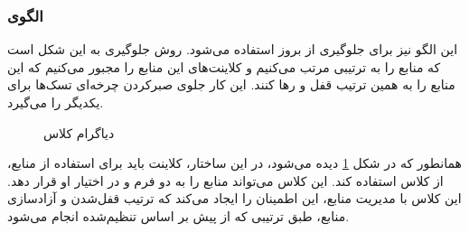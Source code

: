 \subsubsection{الگوی }
\label{scheduleOrderedSec}
\begin{RTL}
این الگو نیز برای جلوگیری از بروز  استفاده می‌شود.
روش جلوگیری به این شکل است که منابع را به ترتیبی مرتب می‌کنیم و
کلاینت‌های این منابع را مجبور می‌کنیم که این منابع را به همین ترتیب قفل و
رها کنند. این کار جلوی صبرکردن چرخه‌ای تسک‌ها برای یکدیگر را می‌گیرد.
\end{RTL}
\begin{figure}[h!]
\centering
{}
\caption{دیاگرام کلاس }
\label{scheduleOrderedClassDiag}
\end{figure}
\begin{RTL}
همانطور که در شکل \ref{scheduleOrderedClassDiag} دیده
می‌شود، در این ساختار، کلاینت باید برای استفاده از منابع، از کلاس
 استفاده کند. این کلاس می‌تواند منابع را به
دو فرم  و  در اختیار او قرار دهد.
این کلاس با مدیریت منابع، این اطمینان را ایجاد می‌کند که ترتیب قفل‌شدن
و آزادسازی منابع، طبق ترتیبی که از پیش بر اساس 
تنظیم‌شده انجام می‌شود.
\end{RTL}